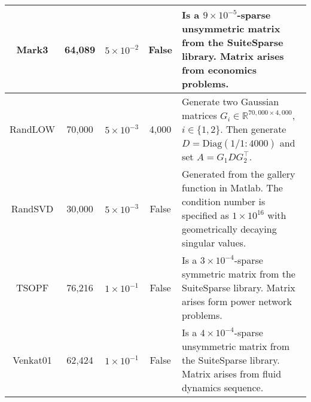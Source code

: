 \begin{center}
\begin{longtable}{|c|c|c|c|p{.27\linewidth}|}
         Mark3 & 64,089 &$5\times10^{-2}$ & False & Is a $9 \times 10^{-5}$-sparse unsymmetric matrix from the SuiteSparse library. Matrix arises from economics problems.\\  \hline
        RandLOW & 70,000 &$5\times10^{-3}$ & 4,000 &Generate two Gaussian matrices $G_i \in \mathbb{R}^{70,000 \times 4,000}$, $i \in \{1,2\}$. Then generate $D=\text{Diag}(1/1:4000)$ and set $A = G_1 DG_2^\top$. \\ \hline
         RandSVD & 30,000 &$5\times10^{-3}$ & False & Generated from the gallery function in Matlab. The condition number is specified as $1 \times 10^{16}$ with geometrically decaying singular values.\\ \hline
        TSOPF & 76,216 & $1\times10^{-1}$& False & Is a $3 \times 10^{-4}$-sparse symmetric matrix from the SuiteSparse library. Matrix arises form power network problems.\\ \hline
        Venkat01 & 62,424 & $1\times10^{-1}$& False & Is a $4 \times 10^{-4}$-sparse unsymmetric matrix from the SuiteSparse library. Matrix arises from fluid dynamics sequence.\\  \hline
    \end{longtable} 
\end{center}


